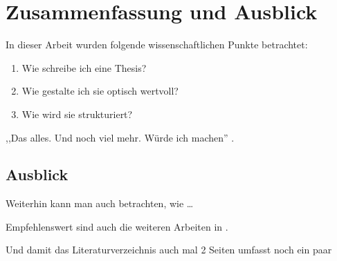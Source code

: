 
\chapter{Zusammenfassung und Ausblick}\label{ch:conclusions}

In dieser Arbeit wurden folgende wissenschaftlichen Punkte betrachtet:

\begin{enumerate}
  \item Wie schreibe ich eine Thesis?
  \item Wie gestalte ich sie optisch wertvoll?
  \item Wie wird sie strukturiert?
\end{enumerate}

,,Das alles. Und noch viel mehr. Würde ich machen'' \cite{superbuch2007}.

\section{Ausblick}

Weiterhin kann man auch betrachten, wie \ldots

Empfehlenswert sind auch die weiteren Arbeiten in \cite{reinhardt12tracebase,englert13highresolution,reinhardt12distributed,reinhardt11smartmeterkom}.

Und damit das Literaturverzeichnis auch mal 2 Seiten umfasst noch ein paar \cite{bentley:1999,bringhurst:2002,cormen:2001,dueck:trio,knuth:1976,knuth:1974,sommerville:1992,taleb:2012}